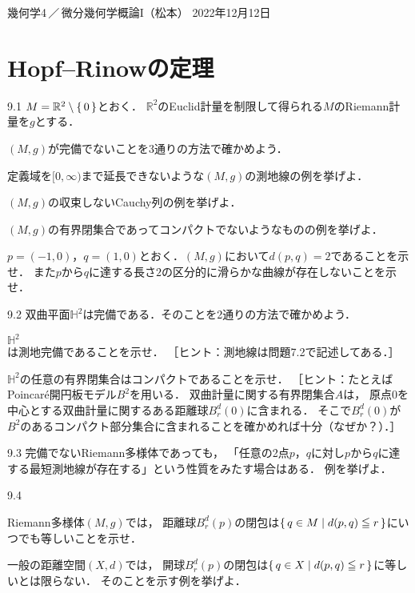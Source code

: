\documentclass[uplatex,dvipdfmx,fontsize=12pt,jafontsize=11pt,line_length=42zw,number_of_lines=36,hanging_punctuation]{jlreq}
\begin{document}
\begin{flushleft}
	幾何学4\,／\,微分幾何学概論I（松本）
	\hfill
	2022年12月12日
\end{flushleft}
\setcounter{section}{8}
\section{Hopf--Rinowの定理}

\begin{enumerate-problems}
	\item[9.1]
		$M=\mathbb{R}^2\setminus\set{0}$とおく．
		$\mathbb{R}^2$のEuclid計量を制限して得られる$M$のRiemann計量を$g$とする．
		\begin{enumerate-subproblems}
			\item
				$(M,g)$が完備でないことを3通りの方法で確かめよう．
				\begin{enumerate-alphabet}
					\item
						定義域を$[0,\infty)$まで延長できないような$(M,g)$の測地線の例を挙げよ．
					\item
						$(M,g)$の収束しないCauchy列の例を挙げよ．
					\item
						$(M,g)$の有界閉集合であってコンパクトでないようなものの例を挙げよ．
				\end{enumerate-alphabet}
			\item
				$p=(-1,0)$，$q=(1,0)$とおく．$(M,g)$において$d(p,q)=2$であることを示せ．
				また$p$から$q$に達する長さ$2$の区分的に滑らかな曲線が存在しないことを示せ．
		\end{enumerate-subproblems}
	\item[9.2]
		双曲平面$\mathbb{H}^2$は完備である．そのことを2通りの方法で確かめよう．
		\begin{enumerate-subproblems}
			\item
				$\mathbb{H}^2$は測地完備であることを示せ．
				［ヒント：測地線は問題7.2で記述してある．］
			\item
				$\mathbb{H}^2$の任意の有界閉集合はコンパクトであることを示せ．
				［ヒント：たとえばPoincar\'e開円板モデル$B^2$を用いる．
				双曲計量に関する有界閉集合$A$は，
				原点$0$を中心とする双曲計量に関するある距離球$B_r^d(0)$に含まれる．
				そこで$B_r^d(0)$が$B^2$のあるコンパクト部分集合に含まれることを確かめれば十分（なぜか？）．］
		\end{enumerate-subproblems}
	\item[9.3]
		完備でないRiemann多様体であっても，
		「任意の2点$p$，$q$に対し$p$から$q$に達する最短測地線が存在する」という性質をみたす場合はある．
		例を挙げよ．
	\item[9.4]\phantom{}
		\begin{enumerate-subproblems}
			\item\vspace{-\baselineskip}
				Riemann多様体$(M,g)$では，
				距離球$B^d_r(p)$の閉包は$\set{q\in M|d(p,q)\leqq r}$にいつでも等しいことを示せ．
			\item
				一般の距離空間$(X,d)$では，
				開球$B^d_r(p)$の閉包は$\set{q\in X|d(p,q)\leqq r}$に等しいとは限らない．
				そのことを示す例を挙げよ．
		\end{enumerate-subproblems}
\end{enumerate-problems}
\end{document}

